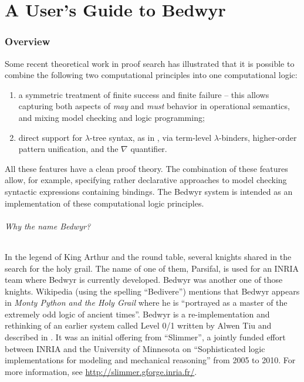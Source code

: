 \part{A User's Guide to Bedwyr}


\section{Overview}

Some recent theoretical work in proof search has illustrated that it is
possible to combine the following two computational principles into one
computational logic:
\begin{enumerate}
  \item a symmetric treatment of finite success and finite failure --
    this allows capturing both aspects of \emph{may} and \emph{must}
    behavior in operational semantics, and mixing model checking and
    logic programming;

  \item direct support for $\lambda$-tree syntax, as in \lp{}, via
    term-level $\lambda$-binders, higher-order pattern unification, and
    the $\nabla$ quantifier.
\end{enumerate}
All these features have a clean proof theory.  The combination of these
features allow, for example, specifying rather declarative approaches to
model checking syntactic expressions containing bindings.  The Bedwyr
system is intended as an implementation of these computational logic
principles.

\paragraph{Why the name Bedwyr?}
In the legend of King Arthur and the round table, several knights shared
in the search for the holy grail.  The name of one of them, Parsifal, is
used for an INRIA team where Bedwyr is currently developed. Bedwyr was
another one of those knights.  Wikipedia (using the spelling
``Bedivere'') mentions that Bedwyr appears in \emph{Monty Python and the
Holy Grail} where he is ``portrayed as a master of the extremely odd
logic of ancient times''.  Bedwyr is a re-implementation and rethinking
of an earlier system called Level 0/1 written by Alwen Tiu and described
in \cite{tiu05eshol}. It was an initial offering from ``Slimmer'', a
jointly funded effort between INRIA and the University of Minnesota on
``Sophisticated logic implementations for modeling and mechanical
reasoning'' from 2005 to 2010. For more information, see
\url{http://slimmer.gforge.inria.fr/}.

